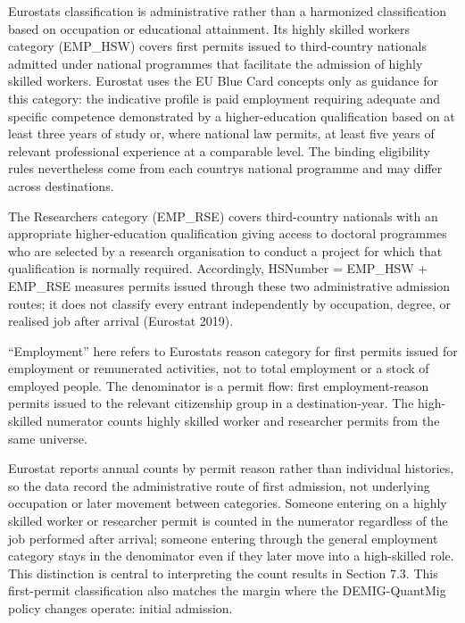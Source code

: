 \documentclass[11pt,a4paper]{article}
\begin{document}
Eurostat\textquotesingle s classification is administrative rather than
a harmonized classification based on occupation or educational
attainment. Its highly skilled workers category (EMP\_HSW) covers first
permits issued to third-country nationals admitted under national
programmes that facilitate the admission of highly skilled workers.
Eurostat uses the EU Blue Card concepts only as guidance for this
category: the indicative profile is paid employment requiring adequate
and specific competence demonstrated by a higher-education qualification
based on at least three years of study or, where national law permits,
at least five years of relevant professional experience at a comparable
level. The binding eligibility rules nevertheless come from each
country\textquotesingle s national programme and may differ across
destinations.\par
{}
The Researchers category (EMP\_RSE) covers third-country
nationals with an appropriate higher-education qualification giving
access to doctoral programmes who are selected by a research
organisation to conduct a project for which that qualification is
normally required. Accordingly, HSNumber = EMP\_HSW + EMP\_RSE measures
permits issued through these two administrative admission routes; it
does not classify every entrant independently by occupation, degree, or
realised job after arrival (Eurostat 2019).

``Employment'' here refers to Eurostat\textquotesingle s reason category
for first permits issued for employment or remunerated activities, not
to total employment or a stock of employed people. The denominator is a
permit flow: first employment-reason permits issued to the relevant
citizenship group in a destination-year. The high-skilled numerator
counts highly skilled worker and researcher permits from the same
universe.

Eurostat reports annual counts by permit reason rather than individual
histories, so the data record the administrative route of first
admission, not underlying occupation or later movement between
categories. Someone entering on a highly skilled worker or researcher
permit is counted in the numerator regardless of the job performed after
arrival; someone entering through the general employment category stays
in the denominator even if they later move into a high-skilled role.
This distinction is central to interpreting the count results in Section
7.3. This first-permit classification also matches the margin where the
DEMIG-QuantMig policy changes operate: initial admission.
\end{document}
